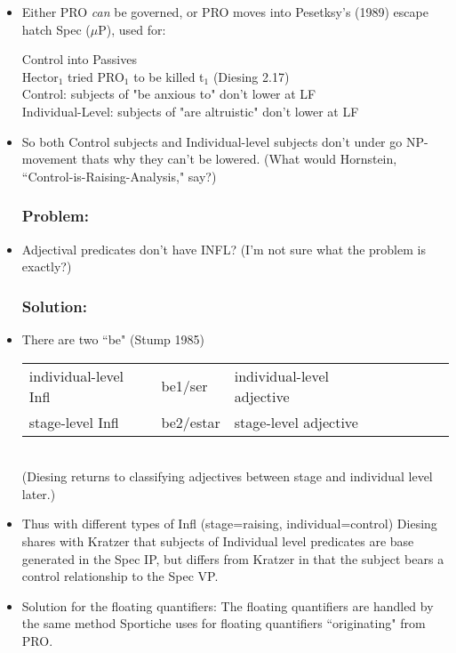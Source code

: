 \documentclass[landscape]{article}
\begin{document}
\begin{itemize}
\item  Either PRO \textit{can} be governed, or PRO moves into Pesetksy's (1989) escape hatch Spec ($\mu$P), used for:
\begin{example} Control into Passives\\
Hector$_1$ tried PRO$_1$ to be killed t$_1$ (Diesing 2.17)\\
Control: subjects of "be anxious to" don't lower at LF\\
Individual-Level: subjects of "are altruistic" don't lower at LF
\end{example}
\item So both Control subjects and Individual-level subjects don't under go NP-movement thats why they can't be lowered. (What would Hornstein, ``Control-is-Raising-Analysis," say?)


\subsubsection*{Problem:}
\item Adjectival predicates don't have INFL? (I'm not sure what the problem is exactly?)

\subsubsection*{Solution:}
\item There are two ``be" (Stump 1985)\\
\begin{tabular}{lllllll}
individual-level Infl& be1/ser &individual-level adjective\\
stage-level Infl & be2/estar&  stage-level adjective\\
\end{tabular}\\
(Diesing returns to classifying adjectives between stage and individual level later.)

\item Thus with different types of Infl (stage=raising, individual=control) Diesing shares with Kratzer that subjects of Individual level predicates are base generated in the Spec IP, but differs from Kratzer in that the subject bears a control relationship to the Spec VP.

\item Solution for the floating quantifiers: The floating quantifiers are handled by the same method Sportiche uses for floating quantifiers ``originating" from PRO.


\end{itemize}
\end{document}

